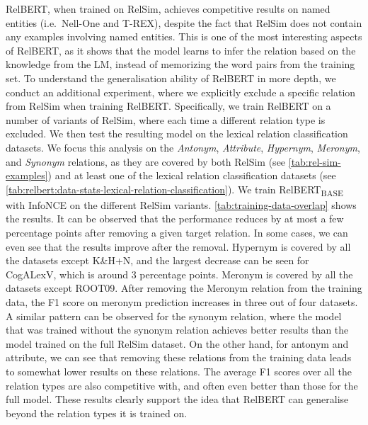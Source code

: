 \documentclass[3p]{elsarticle}
\begin{document}
{%

RelBERT, when trained on RelSim, achieves competitive results on named entities (i.e.\ Nell-One and T-REX), despite the fact that RelSim does not contain any examples involving named entities. This is one of the most interesting aspects of RelBERT, as it shows that the model learns to infer the relation based on the knowledge from the LM, instead of memorizing the word pairs from the training set. To understand the generalisation ability of RelBERT in more depth, we conduct an additional experiment, where we explicitly exclude a specific relation from RelSim when training RelBERT. Specifically, we train RelBERT on a number of variants of RelSim, where each time a different relation type is excluded. We then test the resulting model on the lexical relation classification datasets. We focus this analysis on the \emph{Antonym}, \emph{Attribute}, \emph{Hypernym}, \emph{Meronym}, and \emph{Synonym} relations, as they are covered by both RelSim (see \autoref{tab:rel-sim-examples}) and at least one of the lexical relation classification datasets (see \autoref{tab:relbert:data-stats-lexical-relation-classification}). We train RelBERT\textsubscript{BASE} with InfoNCE on the different RelSim variants. \autoref{tab:training-data-overlap} shows the results. It can be observed that the performance reduces by at most a few percentage points after removing a given target relation. In some cases, we can even see that the results improve after the removal. Hypernym is covered by all the datasets except K\&H+N, and the largest decrease can be seen for CogALexV, which is around 3 percentage points.  Meronym is covered by all the datasets except ROOT09. After removing the Meronym relation from the training data, the F1 score on meronym prediction increases in three out of four datasets. A similar pattern can be observed for the synonym relation, where the model that was trained without the synonym relation achieves better results than the model trained on the full RelSim dataset. On the other hand, for antonym and attribute, we can see that removing these relations from the training data leads to somewhat lower results on these relations. The average F1 scores over all the relation types are also competitive with, and often even better than those for the full model. These results clearly support the idea that RelBERT can generalise beyond the relation types it is trained on.

}
\end{document}
